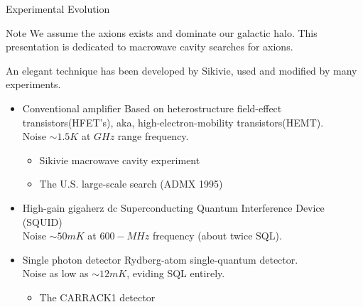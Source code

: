 \documentclass{beamer}
\begin{document}
\begin{frame}{Experimental Evolution}
\begin{block}{Note}
We assume the axions exists and dominate our galactic halo. This  presentation is dedicated to \alert{macrowave cavity} searches for axions.
\end{block}
An elegant technique has been developed by Sikivie, used and modified by many experiments.
\begin{itemize}
\item<1->Conventional amplifier
Based on heterostructure field-effect transistors(HFET's), aka, high-electron-mobility transistors(HEMT).\\
Noise $\sim 1.5 K$ at $GHz$ range frequency.
    \begin{itemize}
    \item Sikivie macrowave cavity experiment
    \item The U.S. large-scale search (ADMX 1995)
    \end{itemize}
\item<2-> High-gain gigaherz dc Superconducting Quantum Interference Device (SQUID)\\
Noise $\sim 50 mK$ at $600-MHz$ frequency (about twice SQL).
\item<3->Single photon detector
Rydberg-atom single-quantum detector.\\
Noise as low as $\sim 12 mK$, eviding SQL entirely.
    \begin{itemize}
    \item The CARRACK1 detector
    \end{itemize}
\end{itemize}
\end{frame}

\end{document}
